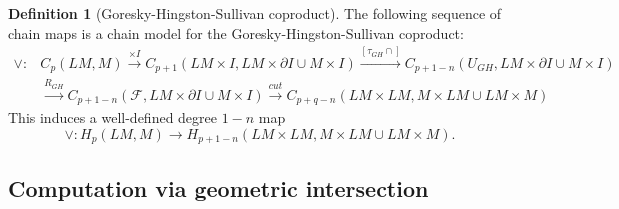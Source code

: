 \documentclass[reqno]{amsart}
\theoremstyle{definition}
\newtheorem{definition}[theorem]{Definition}
\theoremstyle{remark}
\begin{document}
 \begin{definition}[Goresky-Hingston-Sullivan coproduct]
     The following sequence of chain maps is a chain model for
     the Goresky-Hingston-Sullivan coproduct:
     \begin{align*}
         \vee \colon 
         &C_p(LM,M) 
         \stackrel{\times I}{\longrightarrow} 
         C_{p+1}(LM \times I, LM \times \partial I \cup 
         M \times I) \stackrel{\left[ \tau_{GH} \cap \right] }{\longrightarrow} 
         C_{p+1-n}\left( U_{GH}, LM \times \partial I 
         \cup M \times I \right) \\
         &\stackrel{R_{GH}}{\longrightarrow} 
         C_{p+1-n}\left( \mathcal{F}, LM \times \partial I \cup 
         M \times I\right) \stackrel{cut}{\longrightarrow} 
         C_{p+q-n}\left( LM \times LM, M \times LM \cup 
         LM \times M \right) 
     \end{align*}
     This induces a well-defined degree $1-n$ map
     \[
     \vee \colon H_p (LM,M) \to 
     H_{p+1-n}\left( LM \times LM, M \times LM \cup 
     LM \times M \right) .
     \] 
 \end{definition}











\subsection{Computation via geometric intersection}
\end{document}
